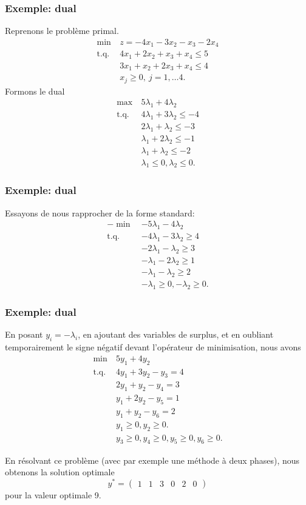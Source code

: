 \documentclass[usepdftitle=false]{beamer}
\begin{document}
\begin{frame}
\frametitle{Exemple: dual}

Reprenons le problème primal.
\begin{align*}
\min\ &z = -4x_1 - 3x_2 -x_3 -2x_4 \\
\mbox{t.q. } & 4x_1 + 2x_2 + x_3 + x_4 \leq 5 \\
& 3x_1 + x_2 + 2x_3 + x_4 \leq 4 \\
& x_j \geq 0,\ j = 1,\ldots 4.
\end{align*}
Formons le dual
\begin{align*}
\max\ & 5\lambda_1 + 4\lambda_2 \\
\mbox{t.q. } &
4\lambda_1 + 3\lambda_2 \leq -4 \\
& 2\lambda_1 + \lambda_2 \leq -3 \\
& \lambda_1 + 2\lambda_2 \leq -1 \\
& \lambda_1 + \lambda_2 \leq -2 \\
& \lambda_1 \leq 0, \lambda_2 \leq 0.
\end{align*}

\end{frame}

\begin{frame}
\frametitle{Exemple: dual}

Essayons de nous rapprocher de la forme standard:
\begin{align*}
-\min\ & -5\lambda_1 - 4\lambda_2 \\
\mbox{t.q. } &
-4\lambda_1 - 3\lambda_2 \geq 4 \\
& -2\lambda_1 - \lambda_2 \geq 3 \\
& -\lambda_1 - 2\lambda_2 \geq 1 \\
& -\lambda_1 - \lambda_2 \geq 2 \\
& -\lambda_1 \geq 0, -\lambda_2 \geq 0.
\end{align*}

\end{frame}

\begin{frame}
\frametitle{Exemple: dual}

En posant $y_i = -\lambda_i$, en ajoutant des variables de surplus, et en oubliant temporairement le signe négatif devant l'opérateur de minimisation, nous avons
\begin{align*}
\min\ & 5y_1 + 4y_2 \\
\mbox{t.q. } &
4y_1 + 3y_2 - y_3 = 4 \\
& 2y_1 + y_2 - y_4 = 3 \\
& y_1 + 2y_2 - y_5 = 1 \\
& y_1 + y_2 -y_6 = 2 \\
& y_1 \geq 0, y_2 \geq 0.\\
& y_3 \geq 0, y_4 \geq 0, y_5 \geq 0, y_6 \geq 0.
\end{align*}

En résolvant ce problème (avec par exemple une méthode à deux phases), nous obtenons la solution optimale
\[
y^* =
\begin{pmatrix}
1 & 1 & 3 & 0 & 2 & 0
\end{pmatrix}
\]
pour la valeur optimale 9.

\end{frame}
\end{document}
